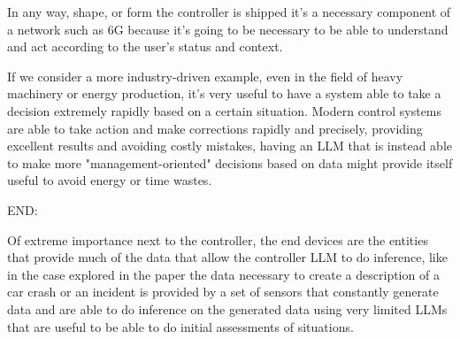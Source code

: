 In any way, shape, or form the controller is shipped it's a necessary component of a network such as
6G because it's going to be necessary to be able to understand and act according to the user's
status and context.

If we consider a more industry-driven example, even in the field of heavy machinery or energy
production, it's very useful to have a system able to take a decision extremely rapidly based on a
certain situation. Modern control systems are able to take action and make corrections rapidly and
precisely, providing excellent results and avoiding costly mistakes, having an LLM that is instead able
to make more "management-oriented" decisions based on data might provide itself useful to avoid
energy or time wastes.

\bigskip
\noindent
END:
\label{ssec:end}

Of extreme importance next to the controller, the end devices are the entities that provide much of
the data that allow the controller LLM to do inference, like in the case explored in the \cite{pga}
paper the data necessary to create a description of a car crash or an incident is provided by a set
of sensors that constantly generate data and are able to do inference on the generated data using
very limited LLMs that are useful to be able to do initial assessments of situations.
